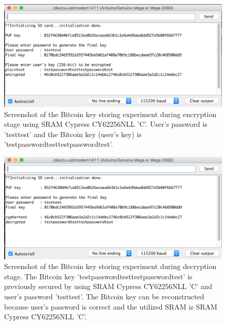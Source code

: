 \begin{figure}[tph!]
    \centerline{\includegraphics[width={\textwidth}]{images/C_encrypt}}
    \caption{Screenshot of the Bitcoin key storing experiment during encryption stage using SRAM Cypress CY62256NLL 'C'.
    User's password is 'testtest' and the Bitcoin key (user's key) is 'testpasswordtesttestpasswordtest'.}
    \label{fig:C_encrypt}
\end{figure}

\begin{figure}[tph!]
    \centerline{\includegraphics[width={\textwidth}]{images/C_decrypt_correct}}
    \caption{Screenshot of the Bitcoin key storing experiment during decryption stage. The Bitcoin key 'testpasswordtesttestpasswordtest' is previously secured by using SRAM Cypress CY62256NLL 'C' and user's password 'testtest'.
    The Bitcoin key can be reconstructed because user's password is correct and the utilized SRAM is SRAM Cypress CY62256NLL 'C'.}
    \label{fig:C_decrypt_correct}
\end{figure}

